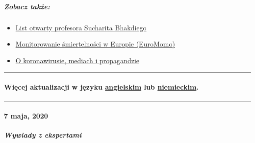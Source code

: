 \hypertarget{zobacz-takux17ce}{%
\subparagraph{\texorpdfstring{\textbf{Zobacz
także}:}{Zobacz także:}}\label{zobacz-takux17ce}}

\begin{itemize}
\tightlist
\item
  \href{https://swprs.org/open-letter-from-professor-sucharit-bhakdi-to-german-chancellor-dr-angela-merkel/}{List
  otwarty profesora Sucharita Bhakdiego}
\item
  \href{https://www.euromomo.eu/}{Monitorowanie śmiertelności w Europie
  (EuroMomo)}
\item
  \href{https://swprs.org/corona-media-propaganda/}{O koronawirusie,
  mediach i propagandzie}
\end{itemize}

\begin{center}\rule{0.5\linewidth}{\linethickness}\end{center}

\hypertarget{wiux119cej-aktualizacji-w-jux119zyku-angielskim-lub-niemieckim}{%
\paragraph{\texorpdfstring{Więcej aktualizacji w języku
\href{https://swprs.org/a-swiss-doctor-on-covid-19/}{angielskim} lub
\href{https://swprs.org/covid-19-hinweis-ii/}{niemieckim}.}{Więcej aktualizacji w języku angielskim lub niemieckim.}}\label{wiux119cej-aktualizacji-w-jux119zyku-angielskim-lub-niemieckim}}

\begin{center}\rule{0.5\linewidth}{\linethickness}\end{center}

\hypertarget{7-maja-2020}{%
\paragraph{7 maja, 2020}\label{7-maja-2020}}

\hypertarget{wywiady-z-ekspertami}{%
\subparagraph{\texorpdfstring{\textbf{Wywiady z
ekspertami}}{Wywiady z ekspertami}}\label{wywiady-z-ekspertami}}

